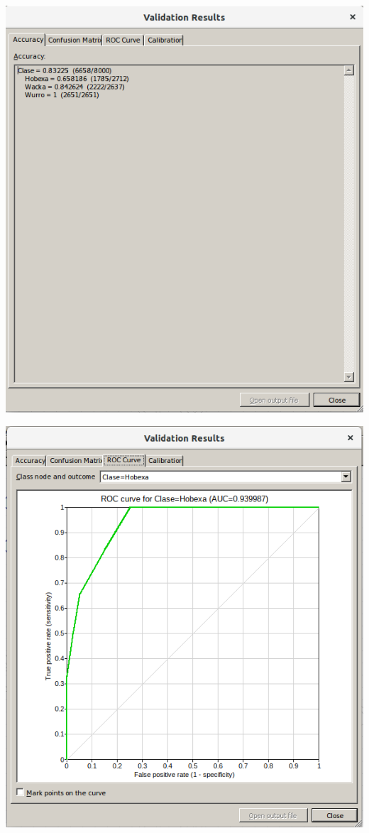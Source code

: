 \documentclass{article}
\begin{document}
\begin{center}
\includegraphics[scale=0.4]{images/4a.png}
\end{center}

\begin{center}
\includegraphics[scale=0.4]{images/4c.png}
\end{center}
\end{document}
